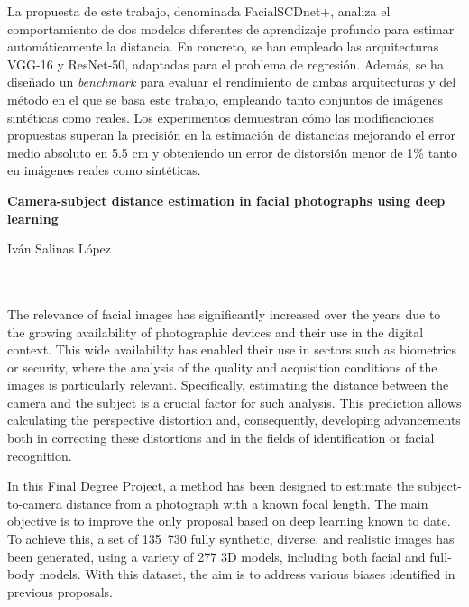 La propuesta de este trabajo, denominada FacialSCDnet+, analiza el comportamiento de dos modelos diferentes de aprendizaje profundo para estimar automáticamente la distancia. En concreto, se han empleado las arquitecturas VGG-16 y ResNet-50, adaptadas para el problema de regresión. Además, se ha diseñado un \textit{benchmark} para evaluar el rendimiento de ambas arquitecturas y del método en el que se basa este trabajo, empleando tanto conjuntos de imágenes sintéticas como reales. Los experimentos demuestran cómo las modificaciones propuestas superan la precisión en la estimación de distancias mejorando el error medio absoluto en 5.5 cm y obteniendo un error de distorsión menor de 1\% tanto en imágenes reales como sintéticas.

\cleardoublepage


\thispagestyle{empty}


\begin{center}
{\large\bfseries Camera-subject distance estimation in facial photographs using deep learning}\\
\end{center}
\begin{center}
Iván Salinas López\\
\end{center}

\\

\vspace{0.7cm}
\\

The relevance of facial images has significantly increased over the years due to the growing availability of photographic devices and their use in the digital context. This wide availability has enabled their use in sectors such as biometrics or security, where the analysis of the quality and acquisition conditions of the images is particularly relevant. Specifically, estimating the distance between the camera and the subject is a crucial factor for such analysis. This prediction allows calculating the perspective distortion and, consequently, developing advancements both in correcting these distortions and in the fields of identification or facial recognition.

In this Final Degree Project, a method has been designed to estimate the subject-to-camera distance from a photograph with a known focal length. The main objective is to improve the only proposal based on deep learning known to date. To achieve this, a set of 135~730 fully synthetic, diverse, and realistic images has been generated, using a variety of 277 3D models, including both facial and full-body models. With this dataset, the aim is to address various biases identified in previous proposals.

